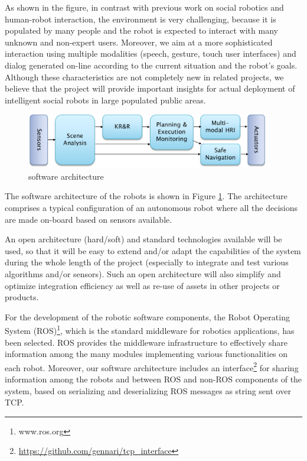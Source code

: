 As shown in the figure, in contrast with previous work on social robotics and human-robot interaction, the {\coaches} environment is very challenging, because it is populated by many people and the robot is expected to interact with many unknown and non-expert users.
Moreover, we aim at a more sophisticated interaction using multiple modalities (speech, gesture, touch user interfaces) and dialog generated on-line according to the current situation
and the robot's goals.
Although these characteristics are not completely new in related projects, we believe that the 
{\coaches} 
project  will provide important insights for actual deployment of intelligent social robots in large populated public areas. 



\begin{figure}[t!]
\centering
\includegraphics[width=0.95\textwidth]{fig/COACHES_swarch_simple.png}
\caption{{\coaches} software architecture}
\label{fig:swarch}
\end{figure}

The software architecture of the {\coaches} robots is shown in Figure \ref{fig:swarch}. The architecture comprises a typical configuration of an autonomous robot  where all the decisions are made on-board based on sensors available.

An open architecture (hard/soft) and standard technologies available will be used, 
so that it will be easy to extend and/or adapt the capabilities of the system during the whole length of the  project  (especially  to  integrate  and  test  various  algorithms  and/or  sensors). Such an open architecture will also simplify and optimize integration efficiency as well as re-use of assets in other projects or products. 

For the development of the robotic software components, the Robot Operating System (ROS)\footnote{www.ros.org}, which is the standard middleware for robotics applications, has been selected.
ROS provides the middleware infrastructure to effectively share information among the many modules implementing various functionalities on each robot. Moreover, our software architecture includes an interface\footnote{\url{https://github.com/gennari/tcp\_interface}} for sharing information among the robots and between ROS and non-ROS components of the system, based on serializing and deserializing ROS messages as string sent over TCP.

